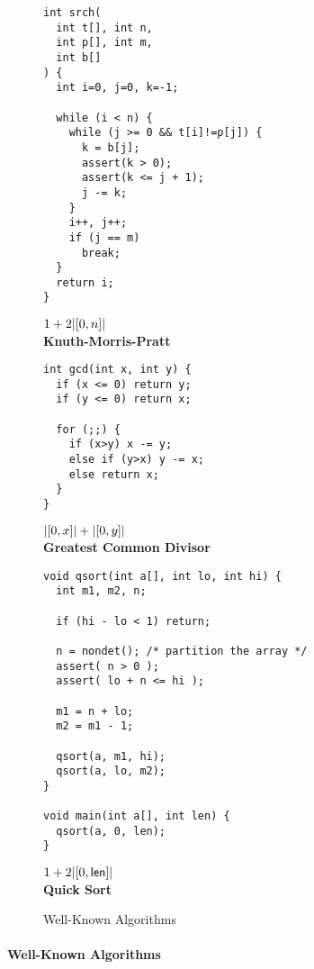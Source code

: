 \documentclass[nocopyrightspace,preprint]{sigplanconf}
\begin{document}
\begin{figure*}[t!]
 \setlength{\progwidth}{.32\linewidth}
  \centering
%
%
  \begin{minipage}[b]{\progwidth}
    \begin{center}
   \begin{lstlisting}
int srch(
  int t[], int n,
  int p[], int m,
  int b[]
) {
  int i=0, j=0, k=-1;

  while (i < n) {
    while (j >= 0 && t[i]!=p[j]) {
      k = b[j];
      assert(k > 0);
      assert(k <= j + 1);
      j -= k;
    }
    i++, j++;
    if (j == m)
      break;
  }
  return i;
}
   \end{lstlisting}

$1 + 2|[0,n]|$
\\[.7\baselineskip]
      {\bf Knuth-Morris-Pratt}
    \end{center}
  \end{minipage}
%
%
  \begin{minipage}[b]{\progwidth}
    \begin{center}
   \begin{lstlisting}
int gcd(int x, int y) {
  if (x <= 0) return y;
  if (y <= 0) return x;

  for (;;) {
    if (x>y) x -= y;
    else if (y>x) y -= x;
    else return x;
  }
}
   \end{lstlisting}

$|[0,x]| + |[0,y]|$
\\[.7\baselineskip]
      {\bf Greatest Common Divisor}
    \end{center}
  \end{minipage}
%
%
  \begin{minipage}[b]{\progwidth}
    \begin{center}
   \begin{lstlisting}
void qsort(int a[], int lo, int hi) {
  int m1, m2, n;

  if (hi - lo < 1) return;

  n = nondet(); /* partition the array */
  assert( n > 0 );
  assert( lo + n <= hi );

  m1 = n + lo;
  m2 = m1 - 1;

  qsort(a, m1, hi);
  qsort(a, lo, m2);
}

void main(int a[], int len) {
  qsort(a, 0, len);
}
   \end{lstlisting}

$1 + 2 |[0,\mathsf{len}]|$
\\[.7\baselineskip]
      {\bf Quick Sort}
    \end{center}
  \end{minipage}

   \caption{Well-Known Algorithms}
  \label{fig:cat3}
\end{figure*}

\paragraph{Well-Known Algorithms}








\end{document}
